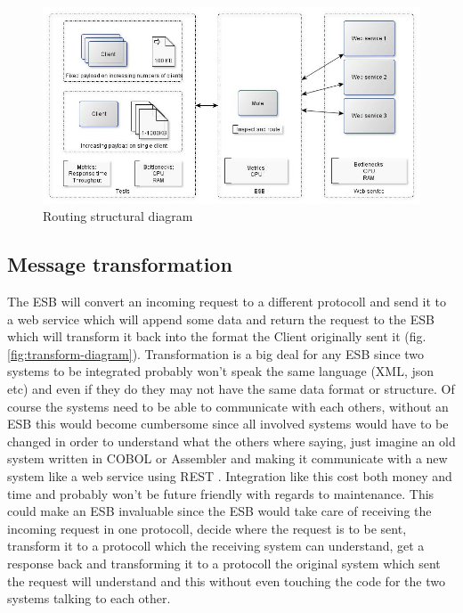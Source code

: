 \begin{figure}[H]
	\centerline{\includegraphics[scale=0.43]{img/Routing}}
	\caption{Routing structural diagram}
	\label{fig:routing-diagram}
\end{figure}

\newpage
\subsection{Message transformation}
The ESB will convert an incoming request to a different protocoll and send it to a web service which will append some data and return the request to the ESB which will transform it back into the format the Client originally sent it (fig.\ref{fig:transform-diagram}).
Transformation is a big deal for any ESB since two systems to be integrated probably won't speak the same language (XML, json etc) and even if they do they may not have the same data format or structure. Of course the systems need to be able to communicate with each others, without an ESB this would become cumbersome since all involved systems would have to be changed in order to understand what the others where saying, just imagine an old system written in COBOL or Assembler and making it communicate with a new system like a web service using REST \cite{whatisrest}. Integration like this cost both money and time and probably won't be future friendly with regards to maintenance.
This could make an ESB invaluable since the ESB would take care of receiving the incoming request in one protocoll, decide where the request is to be sent, transform it to a protocoll which the receiving system can understand, get a response back and transforming it to a protocoll the original system which sent the request will understand and this without even touching the code for the two systems talking to each other.

